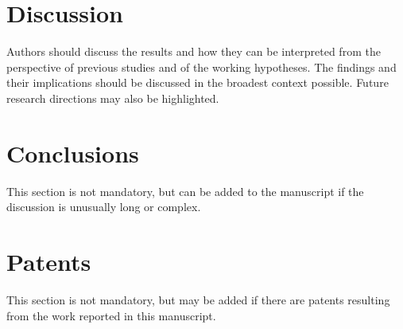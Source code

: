 \documentclass[energies,article,submit,pdftex,moreauthors]{Definitions/mdpi}
\begin{document}
\section{Discussion}
\label{discussion}

Authors should discuss the results and how they can be interpreted from the perspective of previous studies and of the working hypotheses. The findings and their implications should be discussed in the broadest context possible. Future research directions may also be highlighted.

\section{Conclusions}

This section is not mandatory, but can be added to the manuscript if the discussion is unusually long or complex.

\section{Patents}

This section is not mandatory, but may be added if there are patents resulting from the work reported in this manuscript.

\vspace{6pt}


\end{document}
